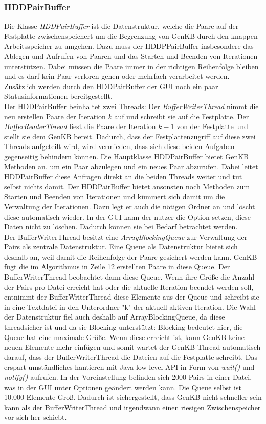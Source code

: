 \documentclass[12pt,a4paper]{article}
\begin{document}
\subsubsection{HDDPairBuffer}
\label{sec:hddBuffer} 
Die Klasse \textit{HDDPairBuffer} ist die Datenstruktur, welche die Paare auf der Festplatte zwischenspeichert um die Begrenzung von GenKB durch den knappen Arbeitsspeicher zu umgehen. Dazu muss der HDDPPairBuffer insbesondere das Ablegen und Aufrufen von Paaren und das Starten und Beenden von Iterationen unterstützen. Dabei müssen die Paare immer in der richtigen Reihenfolge bleiben und es darf kein Paar verloren gehen oder mehrfach verarbeitet werden. Zusätzlich werden durch den HDDPairBuffer der GUI noch ein paar Statusinformationen bereitgestellt.\\
Der HDDPairBuffer beinhaltet zwei Threads: Der \textit{BufferWriterThread} nimmt die neu erstellen Paare der Iteration $k$ auf und schreibt sie auf die Festplatte. Der \textit{BufferReaderThread} liest die Paare der Iteration $k-1$ von der Festplatte und stellt sie dem GenKB bereit. Dadurch, dass der Festplattenzugriff auf diese zwei Threads aufgeteilt wird, wird vermieden, dass sich diese beiden Aufgaben gegenseitig behindern können. Die Hauptklasse HDDPairBuffer bietet GenKB Methoden an, um ein Paar abzulegen und ein neues Paar abzurufen. Dabei leitet HDDPairBuffer diese Anfragen direkt an die beiden Threads weiter und tut selbst nichts damit. Der HDDPairBuffer bietet ansonsten noch Methoden zum Starten und Beenden von Iterationen und kümmert sich damit um die Verwaltung der Iterationen. Dazu legt er auch die nötigen Ordner an und löscht diese automatisch wieder. In der GUI kann der nutzer die Option setzen, diese Daten nicht zu löschen. Dadurch können sie bei Bedarf betrachtet werden.\\
Der BufferWriterThread besitzt eine \textit{ArrayBlockingQueue} zur Verwaltung der Pairs als zentrale Datenstruktur. Eine Queue als Datenstruktur bietet sich deshalb an, weil damit die Reihenfolge der Paare gesichert werden kann. GenKB fügt die im Algorithmus in Zeile 12 erstellten Paare in diese Queue. Der BufferWriterThread beobachtet dann diese Queue. Wenn ihre Größe die Anzahl der Pairs pro Datei erreicht hat oder die aktuelle Iteration beendet werden soll, entnimmt der BufferWriterThread diese Elemente aus der Queue und schreibt sie in eine Textdatei in den Unterordner "k" der aktuell aktiven Iteration. Die Wahl der Datenstruktur fiel auch deshalb auf ArrayBlockingQueue, da diese threadsicher ist und da sie Blocking unterstützt: Blocking bedeutet hier, die Queue hat eine maximale Größe. Wenn diese erreicht ist, kann GenKB keine neuen Elemente mehr einfügen und somit wartet der GenKB Thread automatisch darauf, dass der BufferWriterThread die Dateien auf die Festplatte schreibt. Das erspart umständliches hantieren mit Java low level API in Form von \textit{wait()} und \textit{notify()} aufrufen. In der Voreinstellung befinden sich 2000 Pairs in einer Datei, was in der GUI unter Optionen geändert werden kann. Die Queue selbst ist 10.000 Elemente Groß. Dadurch ist sichergestellt, dass GenKB nicht schneller sein kann als der BufferWriterThread und irgendwann einen riesigen Zwischenspeicher vor sich her schiebt. \\
\end{document}
